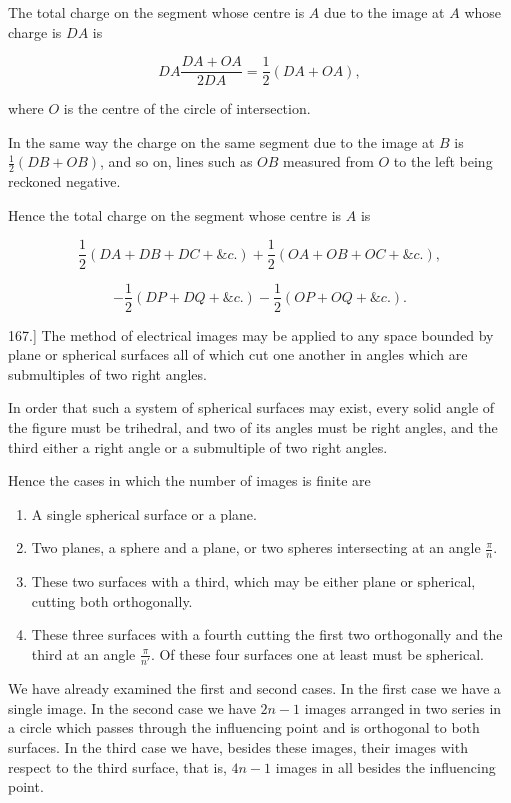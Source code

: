 \documentclass[11pt,a4paper]{article}
\begin{document}
The total charge on the segment whose centre is $A$ due to the image
at $A$ whose charge is $DA$ is

\[
DA\frac{DA+OA}{2DA}=\frac{1}{2}(DA+OA),
\]

where $O$ is the centre of the circle of intersection.

In the same way the charge on the same segment due to the image at
$B$ is $\frac{1}{2}(DB+OB)$, and so on, lines such as $OB$ measured
from $O$ to the left being reckoned negative.

Hence the total charge on the segment whose centre is $A$ is

\[
\frac{1}{2}(DA+DB+DC+\&c.)+\frac{1}{2}(OA+OB+OC+\&c.),
\]

\[
-\frac{1}{2}(DP+DQ+\&c.)-\frac{1}{2}(OP+OQ+\&c.).
\]

167.] The method of electrical images may be applied to any space
bounded by plane or spherical surfaces all of which cut one another in
angles which are submultiples of two right angles.

In order that such a system of spherical surfaces may exist, every
solid angle of the figure must be trihedral, and two of its angles must
be right angles, and the third either a right angle or a submultiple of
two right angles.

Hence the cases in which the number of images is finite are

\begin{enumerate}
\item A single spherical surface or a plane.
\item Two planes, a sphere and a plane, or two spheres intersecting at
an angle $\frac{\pi}{n}$.
\item These two surfaces with a third, which may be either plane or
spherical, cutting both orthogonally.
\item These three surfaces with a fourth cutting the first two
orthogonally and the third at an angle $\frac{\pi}{n'}$. Of these four
surfaces one at least must be spherical.
\end{enumerate}

We have already examined the first and second cases. In the first case
we have a single image. In the second case we have $2n-1$ images
arranged in two series in a circle which passes through the influencing
point and is orthogonal to both surfaces. In the third case we have,
besides these images, their images with respect to the third surface,
that is, $4n-1$ images in all besides the influencing point.
\end{document}
